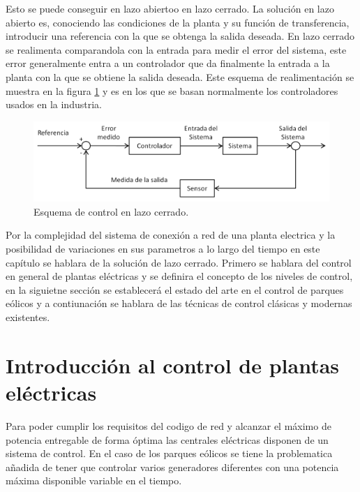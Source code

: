 \documentclass{book}
\begin{document}
Esto se puede conseguir en lazo abiertoo  en lazo cerrado. La solución en lazo abierto es, conociendo las condiciones de la planta y su funci\'on de transferencia, introducir una referencia con la que se obtenga la salida deseada. En lazo cerrado se realimenta comparandola con la entrada para medir el error del sistema, este error generalmente entra a un controlador que da finalmente la entrada a la planta con la que se obtiene la salida deseada. Este esquema de realimentaci\'on se muestra en la figura \ref{FeedBackLoop} y es en los que se basan normalmente los controladores usados en la industria. \par

\begin{figure}[h!]
\centering
\includegraphics[width=1\textwidth]{Realimentacion.PNG}
\caption{Esquema de control en lazo cerrado.}
\label{FeedBackLoop}
\end{figure}

Por la complejidad del sistema de conexi\'on a red de una planta electrica y la posibilidad de variaciones en sus parametros a lo largo del tiempo en este cap\'itulo se hablara de la soluci\'on de lazo cerrado. Primero se hablara del control en general de plantas el\'ectricas y se definira el concepto de los niveles de control, en la siguietne secci\'on se establecer\'a el estado del arte en el control de parques e\'olicos y a contiunaci\'on se hablara de las t\'ecnicas de control cl\'asicas y modernas existentes. \par 

	\section{Introducci\'on al control de plantas el\'ectricas}

Para poder cumplir los requisitos del codigo de red y alcanzar el m\'aximo de potencia entregable de forma \'optima las centrales el\'ectricas disponen de un sistema de control. En el caso de los parques e\'olicos se tiene la problematica añadida de tener que controlar varios generadores diferentes con una potencia m\'axima disponible variable en el tiempo. \par
\end{document}
